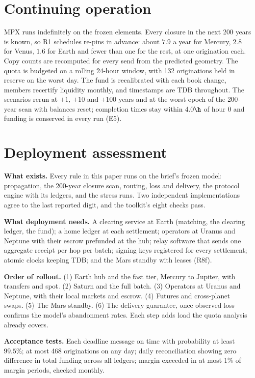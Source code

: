 \section{Continuing operation}\label{sec:cont}
MPX runs indefinitely on the frozen elements. Every closure in the next 200 years is known, so R1 schedules re-pins in advance: about $7.9$ a year for Mercury, $2.8$ for Venus, $1.6$ for Earth and fewer than one for the rest, at one origination each. Copy counts are recomputed for every send from the predicted geometry. The quota is budgeted on a rolling 24-hour window, with 132 originations held in reserve on the worst day. The fund is recalibrated with each book change, members recertify liquidity monthly, and timestamps are TDB throughout. The scenarios rerun at $+1$, $+10$ and $+100$ years and at the worst epoch of the 200-year scan with balances reset; completion times stay within $4.0\h$ of hour 0 and funding is conserved in every run (E5).

\section{Deployment assessment}\label{sec:deploy}
\textbf{What exists.} Every rule in this paper runs on the brief's frozen model: propagation, the 200-year closure scan, routing, loss and delivery, the protocol engine with its ledgers, and the stress runs. Two independent implementations agree to the last reported digit, and the toolkit's eight checks pass.

\textbf{What deployment needs.} A clearing service at Earth (matching, the clearing ledger, the fund); a home ledger at each settlement; operators at Uranus and Neptune with their escrow prefunded at the hub; relay software that sends one aggregate receipt per hop per batch; signing keys registered for every settlement; atomic clocks keeping TDB; and the Mars standby with leases (R8f).

\textbf{Order of rollout.} (1) Earth hub and the fast tier, Mercury to Jupiter, with transfers and spot. (2) Saturn and the full batch. (3) Operators at Uranus and Neptune, with their local markets and escrow. (4) Futures and cross-planet swaps. (5) The Mars standby. (6) The delivery guarantee, once observed loss confirms the model's abandonment rates. Each step adds load the quota analysis already covers.

\textbf{Acceptance tests.} Each deadline message on time with probability at least $99.5\%$; at most 468 originations on any day; daily reconciliation showing zero difference in total funding across all ledgers; margin exceeded in at most $1\%$ of margin periods, checked monthly.

